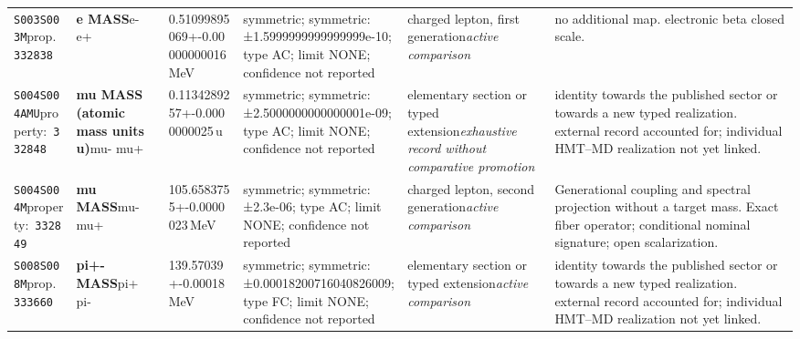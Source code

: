 \begin{landscape}
\begin{longtable}{L{1.85cm}L{4.45cm}L{2.35cm}L{4.05cm}L{3.35cm}L{7.15cm}}
\texttt{S003}\newline \texttt{S003M}\newline prop.\ \texttt{332838} & \textbf{e MASS}\newline e- \textbar{}\allowbreak{} e+ & 0.51099895069+-0.00000000016\,MeV & symmetric; symmetric: ±1.5999999999999999e-10; type AC; limit NONE; confidence not reported & charged lepton, first generation\newline \emph{active comparison} & no additional map. electronic beta closed scale. \\
\texttt{S004}\newline \texttt{S004AMU}\newline property:\ \texttt{332848} & \textbf{mu MASS (atomic mass units u)}\newline mu- \textbar{}\allowbreak{} mu+ & 0.1134289257+-0.0000000025\,u & symmetric; symmetric: ±2.5000000000000001e-09; type AC; limit NONE; confidence not reported & elementary section or typed extension\newline \emph{exhaustive record without comparative promotion} & identity towards the published sector or towards a new typed realization. external record accounted for; individual HMT--MD realization not yet linked. \\
\texttt{S004}\newline \texttt{S004M}\newline property:\ \texttt{332849} & \textbf{mu MASS}\newline mu- \textbar{}\allowbreak{} mu+ & 105.6583755+-0.0000023\,MeV & symmetric; symmetric: ±2.3e-06; type AC; limit NONE; confidence not reported & charged lepton, second generation\newline \emph{active comparison} & Generational coupling and spectral projection without a target mass. Exact fiber operator; conditional nominal signature; open scalarization. \\
\texttt{S008}\newline \texttt{S008M}\newline prop.\ \texttt{333660} & \textbf{pi+- MASS}\newline pi+ \textbar{}\allowbreak{} pi- & 139.57039+-0.00018\,MeV & symmetric; symmetric: ±0.00018200716040826009; type FC; limit NONE; confidence not reported & elementary section or typed extension\newline \emph{active comparison} & identity towards the published sector or towards a new typed realization. external record accounted for; individual HMT--MD realization not yet linked. \\

\end{longtable}
\end{landscape}
